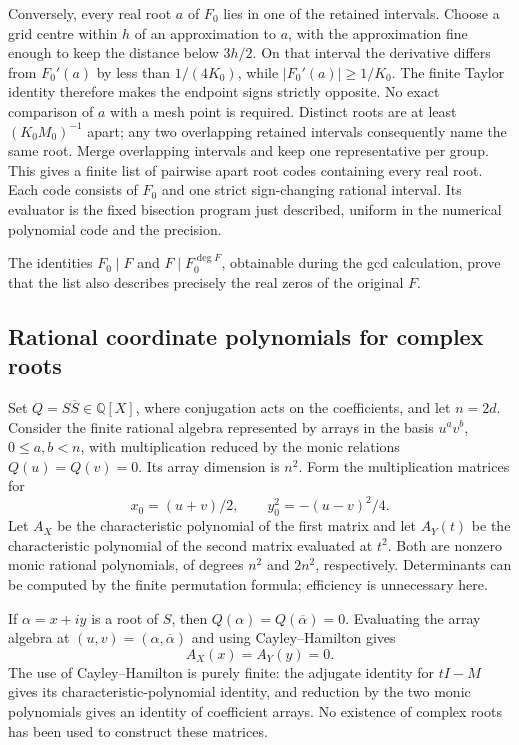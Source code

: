 Conversely, every real root $a$ of $F_0$ lies in one of the retained
intervals. Choose a grid centre within $h$ of an approximation to $a$,
with the approximation fine enough to keep the distance below $3h/2$.
On that interval the derivative differs from $F_0'(a)$ by less than
$1/(4K_0)$, while $|F_0'(a)|\ge1/K_0$. The finite Taylor identity therefore
makes the endpoint signs strictly opposite. No exact comparison of $a$
with a mesh point is required. Distinct roots are at least
$(K_0M_0)^{-1}$ apart; any two overlapping retained intervals consequently
name the same root. Merge overlapping intervals and keep one representative
per group. This gives a finite list of pairwise apart root codes containing
every real root. Each code consists of $F_0$ and one strict sign-changing
rational interval. Its evaluator is the fixed bisection program just
described, uniform in the numerical polynomial code and the precision.

The identities $F_0\mid F$ and $F\mid F_0^{\deg F}$, obtainable during
the gcd calculation, prove that the list also describes precisely the
real zeros of the original $F$.

\subsection{Rational coordinate polynomials for complex roots}

Set $Q=S\overline S\in\mathbb Q[X]$, where conjugation acts on the
coefficients, and let $n=2d$. Consider the finite rational algebra represented
by arrays in the basis $u^av^b$, $0\le a,b<n$, with multiplication reduced
by the monic relations $Q(u)=Q(v)=0$. Its array dimension is $n^2$.
Form the multiplication matrices for
\[
                        x_0=(u+v)/2,
             \qquad     y_0^2=-(u-v)^2/4.
\]
Let $A_X$ be the characteristic polynomial of the first matrix and let
$A_Y(t)$ be the characteristic polynomial of the second matrix evaluated
at $t^2$. Both are nonzero monic rational polynomials, of degrees $n^2$
and $2n^2$, respectively. Determinants can be computed by the finite
permutation formula; efficiency is unnecessary here.

If $\alpha=x+iy$ is a root of $S$, then $Q(\alpha)=Q(\overline\alpha)=0$.
Evaluating the array algebra at $(u,v)=(\alpha,\overline\alpha)$ and using
Cayley--Hamilton gives
\begin{equation}
                         A_X(x)=A_Y(y)=0.              \label{eq:coordinate-polynomials}
\end{equation}
The use of Cayley--Hamilton is purely finite: the adjugate identity for
$tI-M$ gives its characteristic-polynomial identity, and reduction by the
two monic polynomials gives an identity of coefficient arrays. No
existence of complex roots has been used to construct these matrices.

